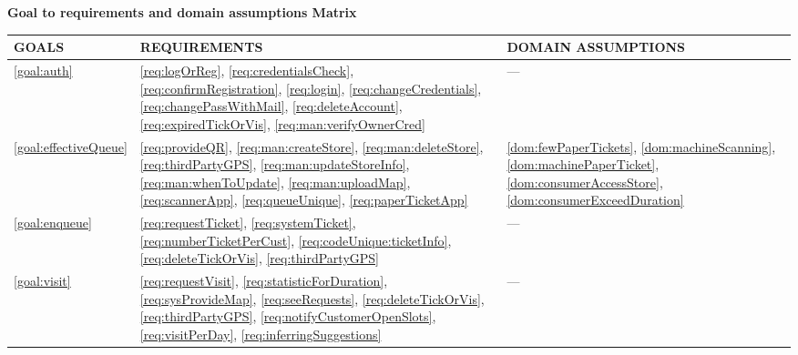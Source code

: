 \documentclass[a4paper, 12pt, oneside]{article}
\begin{document}
\newpage
\label{uc:gToReDMatrix}
\begin{center}
{\textbf{Goal to requirements and domain assumptions Matrix}}
\end{center}

\begin{tabularx}{\linewidth}{| p{20mm} | p{50mm} | p{50mm} |}

     \hline
    GOALS & REQUIREMENTS & DOMAIN ASSUMPTIONS \\
    \hline 
    \ref{goal:auth} & \ref{req:logOrReg}, \ref{req:credentialsCheck}, \ref{req:confirmRegistration}, \ref{req:login}, \ref{req:changeCredentials}, \ref{req:changePassWithMail}, \ref{req:deleteAccount}, \ref{req:expiredTickOrVis}, \ref{req:man:verifyOwnerCred} & --- \\
    
    \hline 
    \ref{goal:effectiveQueue} & \ref{req:provideQR}, \ref{req:man:createStore}, \ref{req:man:deleteStore},  \ref{req:thirdPartyGPS}, \ref{req:man:updateStoreInfo}, \ref{req:man:whenToUpdate}, \ref{req:man:uploadMap}, \ref{req:scannerApp}, \ref{req:queueUnique}, \ref{req:paperTicketApp} & \ref{dom:fewPaperTickets}, \ref{dom:machineScanning}, \ref{dom:machinePaperTicket}, \ref{dom:consumerAccessStore}, \ref{dom:consumerExceedDuration} \\
    
    \hline
    \ref{goal:enqueue} & \ref{req:requestTicket}, \ref{req:systemTicket}, \ref{req:numberTicketPerCust}, \ref{req:codeUnique:ticketInfo}, \ref{req:deleteTickOrVis}, \ref{req:thirdPartyGPS} & ---  \\

    \hline
    
    \ref{goal:visit} & \ref{req:requestVisit}, \ref{req:statisticForDuration}, \ref{req:sysProvideMap}, \ref{req:seeRequests}, \ref{req:deleteTickOrVis}, \ref{req:thirdPartyGPS}, \ref{req:notifyCustomerOpenSlots}, \ref{req:visitPerDay}, \ref{req:inferringSuggestions}  & ---  \\

    \hline
    
\end{tabularx}
\end{document}
